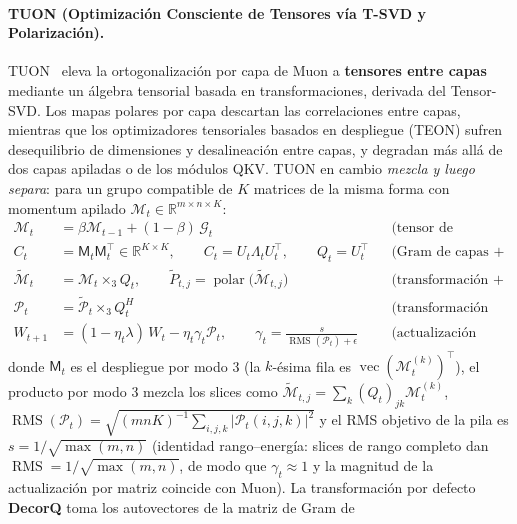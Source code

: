 \paragraph{TUON (Optimización Consciente de Tensores vía T-SVD y Polarización).}
TUON~\citep{tang_tuon_2026} eleva la ortogonalización por capa de Muon a
\textbf{tensores entre capas} mediante un álgebra tensorial basada en transformaciones,
derivada del Tensor-SVD. Los mapas polares por capa descartan las correlaciones entre
capas, mientras que los optimizadores tensoriales basados en despliegue (TEON) sufren
desequilibrio de dimensiones y desalineación entre capas, y degradan más allá de dos
capas apiladas o de los módulos QKV. TUON en cambio \emph{mezcla y luego separa}: para
un grupo compatible de $K$ matrices de la misma forma con momentum apilado
$\mathcal{M}_t \in \mathbb{R}^{m \times n \times K}$:
\begin{align}
\mathcal{M}_t &= \beta \mathcal{M}_{t-1} + (1-\beta)\, \mathcal{G}_t
  && \text{(tensor de momentum, Alg.~1 línea 2)} \\
C_t &= \mathsf{M}_t \mathsf{M}_t^{\top} \in \mathbb{R}^{K \times K}, \qquad
C_t = U_t \Lambda_t U_t^{\top}, \qquad Q_t = U_t^{\top}
  && \text{(Gram de capas + autodescomposición, líneas 3--5)} \\
\widetilde{\mathcal{M}}_t &= \mathcal{M}_t \times_3 Q_t, \qquad
\widetilde{P}_{t,j} = \operatorname{polar}\!\big(\widetilde{\mathcal{M}}_{t,j}\big)
  && \text{(transformación + polarización por slice, líneas 6--9)} \\
\mathcal{P}_t &= \widetilde{\mathcal{P}}_t \times_3 Q_t^{H}
  && \text{(transformación inversa, línea 10)} \\
W_{t+1} &= (1 - \eta_t \lambda)\, W_t - \eta_t \gamma_t \mathcal{P}_t, \qquad
\gamma_t = \frac{s}{\operatorname{RMS}(\mathcal{P}_t) + \epsilon}
  && \text{(actualización escalada por RMS, línea 11)}
\end{align}
donde $\mathsf{M}_t$ es el despliegue por modo 3 (la $k$-ésima fila es
$\operatorname{vec}(\mathcal{M}_t^{(k)})^{\top}$), el producto por modo 3 mezcla los
slices como $\widetilde{\mathcal{M}}_{t,j} = \sum_k (Q_t)_{jk} \mathcal{M}_t^{(k)}$,
$\operatorname{RMS}(\mathcal{P}_t) = \sqrt{(mnK)^{-1} \sum_{i,j,k} |\mathcal{P}_t(i,j,k)|^2}$
y el RMS objetivo de la pila es $s = 1/\sqrt{\max(m,n)}$ (identidad rango--energía: slices
de rango completo dan $\operatorname{RMS} = 1/\sqrt{\max(m,n)}$, de modo que $\gamma_t
\approx 1$ y la magnitud de la actualización por matriz coincide con Muon). La
transformación por defecto \textbf{DecorQ} toma los autovectores de la matriz de Gram de
